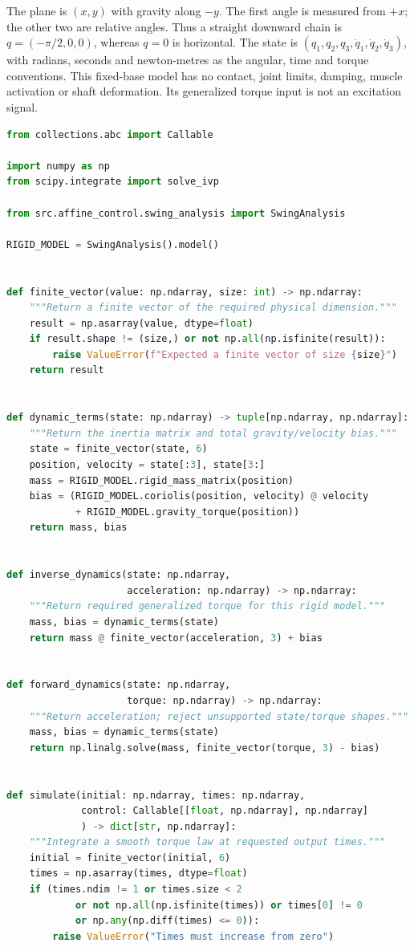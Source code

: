 The plane is $(x,y)$ with gravity along $-y$. The first angle is measured from
$+x$; the other two are relative angles. Thus a straight downward chain is
$q=(-\pi/2,0,0)$, whereas $q=0$ is horizontal. The state is
$(q_1,q_2,q_3,\dot q_1,\dot q_2,\dot q_3)$, with radians, seconds and newton-metres
as the angular, time and torque conventions. This fixed-base model has no
contact, joint limits, damping, muscle activation or shaft deformation. Its
generalized torque input is not an excitation signal.

\begin{lstlisting}[language=Python, caption={Forward and Inverse Dynamics of the Canonical Rigid Chain}]
from collections.abc import Callable

import numpy as np
from scipy.integrate import solve_ivp

from src.affine_control.swing_analysis import SwingAnalysis

RIGID_MODEL = SwingAnalysis().model()


def finite_vector(value: np.ndarray, size: int) -> np.ndarray:
    """Return a finite vector of the required physical dimension."""
    result = np.asarray(value, dtype=float)
    if result.shape != (size,) or not np.all(np.isfinite(result)):
        raise ValueError(f"Expected a finite vector of size {size}")
    return result


def dynamic_terms(state: np.ndarray) -> tuple[np.ndarray, np.ndarray]:
    """Return the inertia matrix and total gravity/velocity bias."""
    state = finite_vector(state, 6)
    position, velocity = state[:3], state[3:]
    mass = RIGID_MODEL.rigid_mass_matrix(position)
    bias = (RIGID_MODEL.coriolis(position, velocity) @ velocity
            + RIGID_MODEL.gravity_torque(position))
    return mass, bias


def inverse_dynamics(state: np.ndarray,
                     acceleration: np.ndarray) -> np.ndarray:
    """Return required generalized torque for this rigid model."""
    mass, bias = dynamic_terms(state)
    return mass @ finite_vector(acceleration, 3) + bias


def forward_dynamics(state: np.ndarray,
                     torque: np.ndarray) -> np.ndarray:
    """Return acceleration; reject unsupported state/torque shapes."""
    mass, bias = dynamic_terms(state)
    return np.linalg.solve(mass, finite_vector(torque, 3) - bias)


def simulate(initial: np.ndarray, times: np.ndarray,
             control: Callable[[float, np.ndarray], np.ndarray]
             ) -> dict[str, np.ndarray]:
    """Integrate a smooth torque law at requested output times."""
    initial = finite_vector(initial, 6)
    times = np.asarray(times, dtype=float)
    if (times.ndim != 1 or times.size < 2
            or not np.all(np.isfinite(times)) or times[0] != 0
            or np.any(np.diff(times) <= 0)):
        raise ValueError("Times must increase from zero")


\end{lstlisting}
